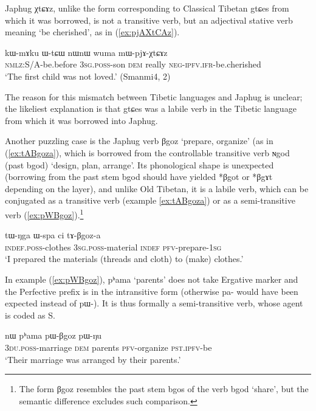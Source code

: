 \documentclass[oldfontcommands,oneside,a4paper,11pt]{article}
\newcommand{\ipa}[1]{{\phon \mbox{#1}}} %
\newcommand{\refb}[1]{(\ref{#1})}
\begin{document}
Japhug \ipa{χtɕɤz}, unlike the form corresponding to Classical Tibetan \ipa{gtɕes} from which it was borrowed, is not a transitive verb, but an adjectival stative verb meaning `be cherished', as in \refb{ex:pjAXtCAz}. 

\begin{exe}
\ex \label{ex:pjAXtCAz}
\gll
\ipa{kɯ-mɤku} 	\ipa{ɯ-tɕɯ} 	\ipa{nɯnɯ} 	\ipa{wuma} 	\ipa{mɯ-pjɤ-χtɕɤz} \\
\textsc{nmlz}:S/A-be.before \textsc{3sg.poss}-son \textsc{dem} really \textsc{neg-ipfv.ifr}-be.cherished \\
\glt `The first child was not loved.' (Smanmi4, 2)
\end{exe}

The reason for this mismatch between Tibetic languages and Japhug is unclear; the likeliest explanation is that \ipa{gtɕes} was a labile verb in the Tibetic language from which it was borrowed into Japhug.


Another puzzling case is the Japhug verb \ipa{βgoz} `prepare, organize' (as in \refb{ex:tABgoza}, which is borrowed from the controllable transitive verb \ipa{ɴgod} (past \ipa{bgod}) `design, plan, arrange'. Its phonological shape is unexpected (borrowing from the past stem \ipa{bgod} should have yielded *\ipa{βgot} or *\ipa{βgɤt} depending on the layer), and unlike Old Tibetan, it is a labile verb, which can be conjugated as a transitive verb (example \ref{ex:tABgoza}) or as a semi-transitive verb (\ref{ex:pWBgoz}).\footnote{The form \ipa{βgoz} resembles the past stem \ipa{bgos} of the verb \ipa{bgod} `share', but the semantic difference excludes such comparison.} 



\begin{exe}
\ex \label{ex:tABgoza}
\gll
\ipa{tɯ-ŋga} 	\ipa{ɯ-spa} 	\ipa{ci} 	\ipa{tɤ-βgoz-a} \\
\textsc{indef.poss}-clothes \textsc{3sg.poss}-material \textsc{indef} \textsc{pfv}-prepare-\textsc{1sg} \\
\glt `I prepared the materials (threads and cloth) to (make) clothes.'
\end{exe}

In example \refb{ex:pWBgoz},  \ipa{pʰama} `parents' does not take Ergative marker and the Perfective prefix is in the intransitive form (otherwise \ipa{pa-} would have been expected instead of \ipa{pɯ-}). It is thus formally a semi-transitive verb, whose agent is coded as S.

\begin{exe}
\ex \label{ex:pWBgoz}
\gll \ipa{ndʑi-stɯnmɯ} 	\ipa{nɯ} 	\ipa{pʰama} 	\ipa{pɯ-βgoz} 	\ipa{pɯ-ŋu} \\
\textsc{3du.poss}-marriage \textsc{dem} parents \textsc{pfv}-organize \textsc{pst.ipfv}-be \\
\glt `Their marriage was arranged by their parents.'
\end{exe}
\end{document}
